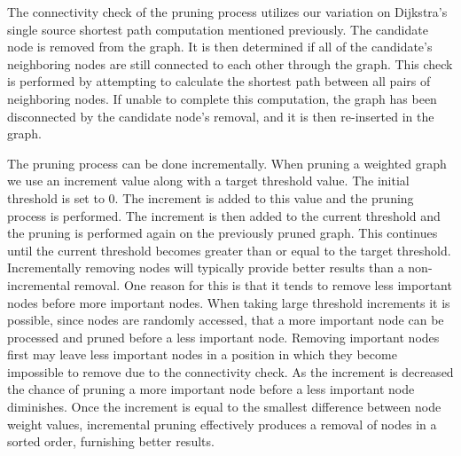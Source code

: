 The connectivity check of the pruning process utilizes our variation on Dijkstra's single source shortest path computation mentioned previously. The candidate node is removed from the graph.  It is then determined if all of the candidate's neighboring nodes are still connected to each other through the graph.  This check is performed by attempting to calculate the shortest path between all pairs of neighboring nodes.  If unable to complete this computation, the graph has been disconnected by the candidate node's removal, and it is then re-inserted in the graph. 

The pruning process can be done incrementally. When pruning a weighted graph we use an increment value along with a target threshold value.  The initial threshold is set to 0. The increment is added to this value and the pruning process is performed. The increment is then added to the current threshold and the pruning is performed again on the previously pruned graph. This continues until the current threshold becomes greater than or equal to the target threshold.  Incrementally removing nodes will typically provide better results than a non-incremental removal.  One reason for this is that it tends to remove less important nodes before more important nodes.  When taking large threshold increments it is possible, since nodes are randomly accessed, that a more important node can be processed and pruned before a less important node.  Removing important nodes first may leave less important nodes in a position in which they become impossible to remove due to the connectivity check.  As the increment is decreased the chance of pruning a more important node before a less important node diminishes. Once the increment is equal to the smallest difference between node weight values, incremental pruning effectively produces a removal of nodes in a sorted order, furnishing better results.



